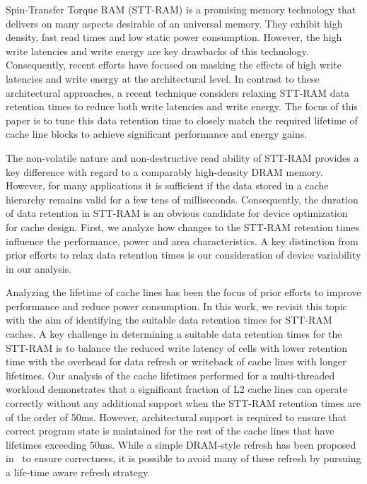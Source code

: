 
Spin-Transfer Torque RAM (STT-RAM) is a promising memory technology that
delivers on many aspects desirable of an universal memory. They exhibit
high density, fast read times and low static power consumption. However,
the high write latencies and write energy are key drawbacks of this
technology. Consequently, recent efforts have focused on masking the
effects of high write latencies and write energy at the architectural level.
In contrast to these architectural approaches, a recent technique
considers relaxing STT-RAM data retention times to reduce both write
latencies and
write energy. The focus of this paper is  to tune this data retention
time to closely match the required lifetime of cache line blocks to
achieve significant
performance and energy gains.

The non-volatile nature and non-destructive read ability of  STT-RAM
provides a key difference with regard to a comparably high-density DRAM
memory. However, for many applications it is sufficient if the data
stored in a cache hierarchy remains valid for a few tens of
milliseconds. Consequently, the duration of data retention in STT-RAM is
an obvious candidate for device optimization for cache design. First,
we  analyze how changes to the STT-RAM retention times influence the
performance, power and area characteristics. A key distinction from
prior efforts to relax data retention times is our consideration of
device variability in our analysis. 

Analyzing the lifetime of cache lines has been the focus of prior
efforts to improve performance and reduce power consumption. In this
work, we
revisit this topic with the aim of identifying the suitable data
retention times for STT-RAM caches. A key challenge in determining a
suitable
data retention times for the STT-RAM is to balance the reduced write
latency of cells with lower retention time with the overhead for data
refresh or
writeback of cache lines with longer lifetimes. Our analysis of the
cache lifetimes performed for a multi-threaded workload demonstrates
that a significant fraction of L2 cache lines can operate correctly
without any additional support when the STT-RAM retention times are of
the order of 50ms. However, architectural support is required to ensure
that correct program state is maintained for the rest of the cache lines
that have lifetimes exceeding 50ms. While a simple
DRAM-style refresh has been proposed in~\cite{STTRAM:HPCA11} to ensure
correctness, it is possible to avoid many of these refresh by pursuing a
life-time aware refresh strategy.


